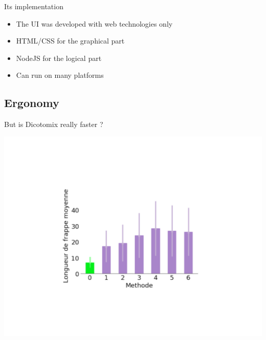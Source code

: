 \documentclass[graphics]{beamer}
\begin{document}
\begin{frame}{Its implementation}
	\begin{itemize}
		\item The UI was developed with web technologies only
		\pause
		\item HTML/CSS for the graphical part
		\pause
		\item NodeJS for the logical part
		\pause
		\item Can run on many platforms
	\end{itemize}
\end{frame}

\subsection{Ergonomy}

\begin{frame}{But is Dicotomix really faster ?}
	\begin{center}
		\includegraphics[scale=0.35]{graphe_comparatif.pdf}
	\end{center}
\end{frame}
\end{document}

